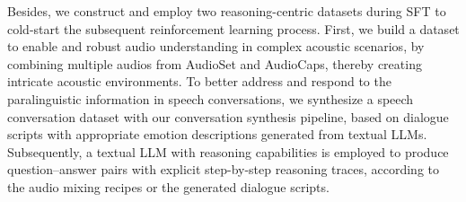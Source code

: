 Besides, we construct and employ two reasoning-centric datasets during SFT to cold-start the subsequent reinforcement learning process.
First, we build a dataset to enable and robust audio understanding in complex acoustic scenarios,
by combining multiple audios from AudioSet and AudioCaps, thereby creating intricate acoustic environments.
To better address and respond to the paralinguistic information in speech conversations,
we synthesize a speech conversation dataset with our conversation synthesis pipeline,
based on dialogue scripts with appropriate emotion descriptions generated from textual LLMs.
Subsequently, a textual LLM with reasoning capabilities is employed to produce question–answer pairs with explicit step-by-step reasoning traces, according to the audio mixing recipes or the generated dialogue scripts.

